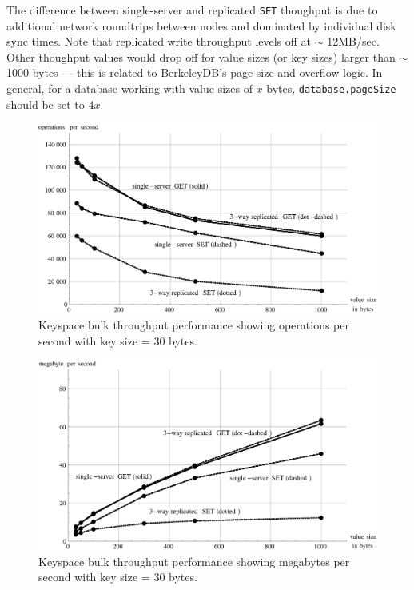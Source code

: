 \documentclass[12pt]{article}
\begin{document}
The difference between single-server and replicated \texttt{SET} thoughput is due to additional network roundtrips between nodes and dominated by individual disk sync times. Note that replicated write throughput levels off at $\sim$ 12MB/sec. Other thoughput values would drop off for value sizes (or key sizes) larger than $\sim$ 1000 bytes --- this is related to BerkeleyDB's page size and overflow logic. In general, for a database working with value sizes of $x$ bytes, \texttt{database.pageSize} should be set to $4x$.

\begin{figure}[h]
\begin{center}
\includegraphics[scale=0.5]{perf_ops1.eps}
\caption{Keyspace bulk throughput performance showing operations per second with key size = 30 bytes.}
\end{center}
\end{figure}

\begin{figure}[h]
\begin{center}
\includegraphics[scale=0.5]{perf_mbs1.eps}
\caption{Keyspace bulk throughput performance showing megabytes per second with key size = 30 bytes.}
\end{center}
\end{figure}
\end{document}
